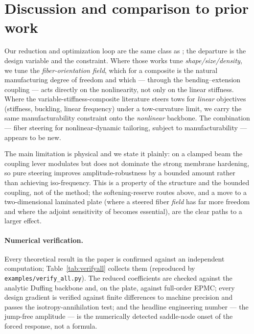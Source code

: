 \documentclass[11pt]{article}
\begin{document}
\section{Discussion and comparison to prior work}

Our reduction and optimization loop are the same class as
\cite{pozzi2025,liang2025,xiao2026}; the departure is the design variable and the
constraint. Where those works tune \emph{shape/size/density}, we tune the
\emph{fiber-orientation field}, which for a composite is the natural
manufacturing degree of freedom and which --- through the bending--extension
coupling --- acts directly on the nonlinearity, not only on the linear stiffness.
Where the variable-stiffness-composite literature
\cite{gurdal,ijsselmuiden} steers tows for \emph{linear} objectives (stiffness,
buckling, linear frequency) under a tow-curvature limit, we carry the same
manufacturability constraint onto the \emph{nonlinear} backbone. The combination
--- fiber steering for nonlinear-dynamic tailoring, subject to manufacturability
--- appears to be new.

The main limitation is physical and we state it plainly: on a clamped beam the
coupling lever modulates but does not dominate the strong membrane hardening, so
pure steering improves amplitude-robustness by a bounded amount rather than
achieving iso-frequency. This is a property of the structure and the bounded
coupling, not of the method; the softening-reserve routes above, and a move to a
two-dimensional laminated plate (where a steered fiber \emph{field} has far more
freedom and where the adjoint sensitivity of \cite{pozzi2025} becomes essential),
are the clear paths to a larger effect.

\paragraph{Numerical verification.} Every theoretical result in the paper is
confirmed against an independent computation; Table~\ref{tab:verifyall} collects
them (reproduced by \texttt{examples/verify\_all.py}). The reduced coefficients are
checked against the analytic Duffing backbone and, on the plate, against full-order
EPMC; every design gradient is verified against finite differences to machine
precision and passes the isotropy-annihilation test; and the headline engineering
number --- the jump-free amplitude --- is the numerically detected saddle-node onset
of the forced response, not a formula.
\end{document}
